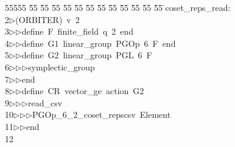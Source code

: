 %
%
\begin{tabbing}
55555 \= 55 \= 55 \= 55 \= 55 \= 55 \= 55 \= 55 \= 55 \= 55 \= 55 \= 55 \= 55 \= \>coset\_reps\_read:\\[0pt]
2\>$\triangleright$\>(ORBITER)\ v\ 2\ \\[0pt]
3\>$\triangleright$\>$\triangleright$\>define\ F\ finite\_field\ q\ 2\ end\ \\[0pt]
4\>$\triangleright$\>$\triangleright$\>define\ G1\ linear\_group\ PGOp\ 6\ F\ end\ \\[0pt]
5\>$\triangleright$\>$\triangleright$\>define\ G2\ linear\_group\ PGL\ 6\ F\ \\[0pt]
6\>$\triangleright$\>$\triangleright$\>$\triangleright$\>symplectic\_group\ \\[0pt]
7\>$\triangleright$\>$\triangleright$\>end\ \\[0pt]
8\>$\triangleright$\>$\triangleright$\>define\ CR\ vector\_ge\ action\ G2\ \\[0pt]
9\>$\triangleright$\>$\triangleright$\>$\triangleright$\>read\_csv\ \\[0pt]
10\>$\triangleright$\>$\triangleright$\>$\triangleright$\>PGOp\_6\_2\_coset\_repscsv\ Element\ \\[0pt]
11\>$\triangleright$\>$\triangleright$\>end\\[0pt]
12\>\end{tabbing}
